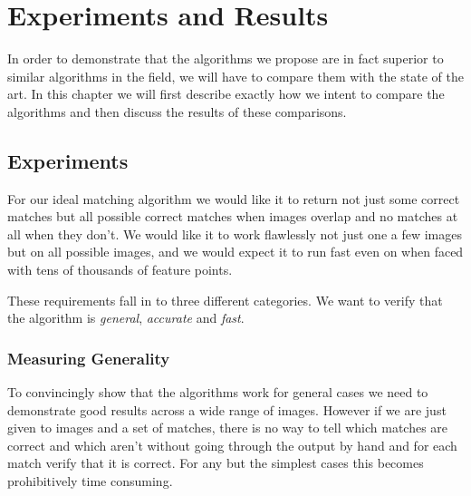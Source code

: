 \chapter{Experiments and Results}
\label{C:Experiments}

In order to demonstrate that the algorithms we propose are in fact 
superior to similar algorithms in the field, we will have to compare 
them with the state of the art. In this chapter we will first describe 
exactly how we intent to compare the algorithms and then discuss the 
results of these comparisons.  

\section{Experiments}
For our ideal matching algorithm we would like it to return not just 
some correct matches but all possible correct matches when images 
overlap and no matches at all when they don't.  We would like it to work 
flawlessly not just one a few images but on all possible images, and we 
would expect it to run fast even on when faced with tens of thousands of 
feature points.

These requirements fall in to three different categories. We want to 
verify that the algorithm is \emph{general}, \emph{accurate} and 
\emph{fast}.

\subsection{Measuring Generality}

To convincingly show that the algorithms work for general cases we need 
to demonstrate good results across a wide range of images.  However if 
we are just given to images and a set of matches, there is no
way to tell which matches are correct and which aren't without going 
through the output by hand and for each match verify that it is correct.  
For any but the simplest cases this becomes prohibitively time 
consuming.

